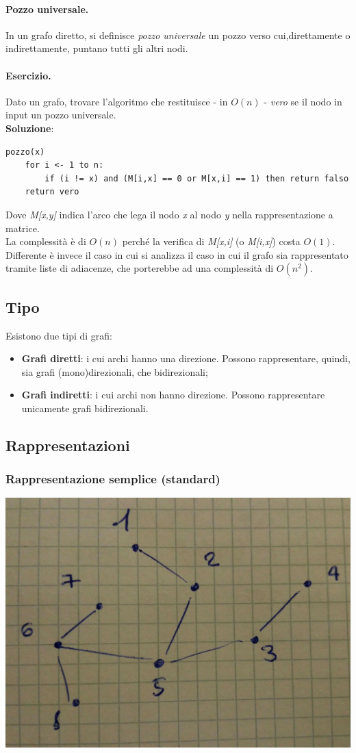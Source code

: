 \paragraph{Pozzo universale.}
In un grafo diretto, si definisce \textit{pozzo universale} un pozzo verso cui,direttamente o indirettamente, puntano tutti gli altri nodi.
\paragraph{Esercizio.}
Dato un grafo, trovare l'algoritmo che restituisce - in $O(n)$ - \textit{vero} se il nodo in input un pozzo universale. \\
\textbf{Soluzione}:
\begin{lstlisting}
pozzo(x)
    for i <- 1 to n:
        if (i != x) and (M[i,x] == 0 or M[x,i] == 1) then return falso
    return vero
\end{lstlisting}
Dove \textit{M[x,y]} indica l'arco che lega il nodo \textit{x} al nodo \textit{y} nella rappresentazione a matrice. \\
La complessità è di $O(n)$ perché la verifica di \textit{M[x,i]} (o \textit{M[i,x]}) costa $O(1)$. Differente è invece il caso in cui si analizza il caso in cui il grafo sia rappresentato tramite liste di adiacenze, che porterebbe ad una complessità di $O(n^2)$.

\subsection{Tipo}
Esistono due tipi di grafi:
\begin{itemize}
    \item \textbf{Grafi diretti}: i cui archi hanno una direzione. Possono rappresentare, quindi, sia grafi (mono)direzionali, che bidirezionali;
    \item \textbf{Grafi indiretti}: i cui archi non hanno direzione. Possono rappresentare unicamente grafi bidirezionali.
\end{itemize}

\newpage

\subsection{Rappresentazioni}
\subsubsection{Rappresentazione semplice (standard)}
\begin{center}
    \includegraphics[width=.4\textwidth]{res/rappresentazione-standard.jpg} \hfill
\end{center}
